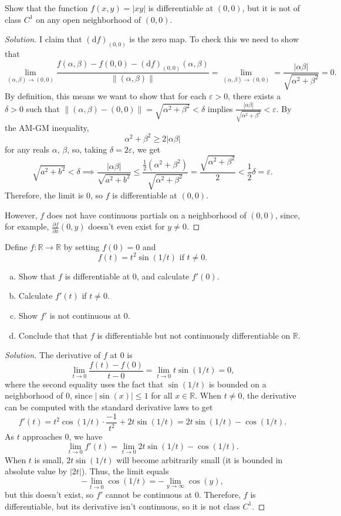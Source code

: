 \documentclass[11pt]{scrartcl}
\providecommand{\eps}{\varepsilon}
\providecommand{\half}{\frac{1}{2}}
\providecommand{\RR}{\mathbb R}
\providecommand{\ii}{\item}
\newenvironment{soln}{\begin{proof}[Solution]}{\end{proof}}
\begin{document}
\pagebreak
\begin{problem}
	Show that the function $f(x,y) = |xy|$ is differentiable at $(0,0)$,
	but it is not of class $C^1$ on any open neighborhood of $(0,0)$.
\end{problem}

\begin{soln}
	I claim that $(\mathrm df)_{(0,0)}$ is the zero map.
	To check this we need to show that
	\[\lim_{(\alpha,\beta)\to (0,0)}
	\frac{f(\alpha,\beta) - f(0,0) - (\mathrm df)_{(0,0)}(\alpha,\beta)}
	{\|(\alpha,\beta)\|} =
	\lim_{(\alpha,\beta)\to(0,0)} = \frac{|\alpha\beta|}
	{\sqrt{\alpha^2+\beta^2}} = 0.\]
	By definition, this means we want to show that for each $\eps > 0$,
	there exists a $\delta > 0$ such that $\|(\alpha,\beta)-(0,0)\|=
	\sqrt{\alpha^2+\beta^2}<\delta$
	implies $\frac{|\alpha\beta|}{\sqrt{\alpha^2+\beta^2}} < \eps$.
	By the AM-GM inequality,
	\[\alpha^2 + \beta^2 \ge 2|\alpha\beta|\]
	for any reals $\alpha$, $\beta$, so, taking $\delta = 2\eps$, we get
	\[\sqrt{a^2+b^2}<\delta \implies \frac{|\alpha\beta|}{\sqrt{a^2+b^2}}
	\le \frac{\half(\alpha^2+\beta^2)}{\sqrt{\alpha^2+\beta^2}}
	= \frac{\sqrt{\alpha^2+\beta^2}}{2} < \half\delta = \eps.\]
	Therefore, the limit is $0$, so $f$ is differentiable at $(0,0)$.
	
	However, $f$ does not have continuous partials on a neighborhood
	of $(0,0)$, since, for example, $\frac{\partial f}{\partial x}(0,y)$
	doesn't even exist for $y\ne 0$.
\end{soln}

\begin{problem}
	Define $f\colon\RR\to\RR$ by setting $f(0) = 0$ and
	\[f(t) = t^2\sin(1/t)\text{ if }t\ne 0.\]
	\begin{enumerate}[(a)]
		\ii Show that $f$ is differentiable at $0$, and calculate $f'(0)$.
		\ii Calculate $f'(t)$ if $t\ne 0$.
		\ii Show $f'$ is not continuous at $0$.
		\ii Conclude that that $f$ is differentiable but
		not continuously differentiable on $\RR$.
	\end{enumerate}
\end{problem}

\begin{soln}
	The derivative of $f$ at $0$ is
	\[\lim_{t\to 0} \frac{f(t) - f(0)}{t-0}
	= \lim_{t\to 0} t\sin(1/t) = 0,\]
	where the second equality uses the fact that $\sin(1/t)$ is bounded
	on a neighborhood of $0$, since $|\sin(x)| \le 1$ for all $x\in\RR$.
	When $t\ne 0$, the derivative can be computed with
	the standard derivative laws to get
	\[f'(t) = t^2\cos(1/t)\cdot\frac{-1}{t^2} + 2t\sin(1/t)
	= 2t\sin(1/t) - \cos(1/t).\]
	As $t$ approaches $0$, we have
	\[\lim_{t\to0} f'(t) = \lim_{t\to0} 2t\sin(1/t) - \cos(1/t).\]
	When $t$ is small,
	$2t\sin(1/t)$ will become arbitrarily small
	(it is bounded in absolute value by $|2t|$). Thus, the limit equals
	\[-\lim_{t\to0} \cos(1/t) = -\lim_{y\to\infty} \cos(y),\]
	but this doesn't exist, so $f'$ cannot be continuous at $0$.
	Therefore, $f$ is differentiable, but its derivative isn't continuous,
	so it is not class $C^1$.
\end{soln}
\end{document}
